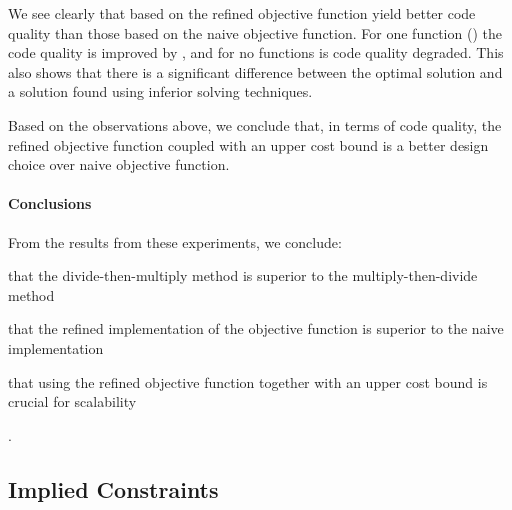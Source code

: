 We see clearly that  based on the refined
\gls{objective function} yield better code quality than those based on the naive
\gls{objective function}.
%
For one \gls{function} () the code quality is improved by
\printZCNorm{%
  \ObjFunRefinedVsNaiveCyclesSpeedupRefinedVsNaiveWLbUbCyclesZeroCenteredSpeedupMax%
}, and for no \glspl{function} is code quality degraded.
%
This also shows that there is a significant difference between the optimal
\gls{solution} and a \gls{solution} found using inferior solving techniques.

Based on the observations above, we conclude that, in terms of code quality, the
refined \gls{objective function} coupled with an upper cost bound is a better
design choice over naive \gls{objective function}.


\paragraph{Conclusions}

From the results from these experiments, we conclude:
%
\begin{enumerate*}[label=(\roman*), itemjoin={;\ }, itemjoin*={; and\ }]
  \item that the \gls{divide-then-multiply method} is superior to the
    \gls{multiply-then-divide method}
  \item that the refined implementation of the \gls{objective function} is
    superior to the naive implementation
  \item that using the refined \gls{objective function} together with an upper
    cost bound is crucial for scalability
\end{enumerate*}.


\subsection{Implied Constraints}



